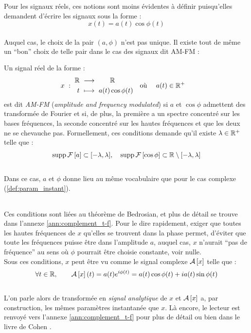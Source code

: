 Pour les signaux réels, ces notions sont moins évidentes à définir puisqu'elles demandent d'écrire les signaux sous la forme :
\[x(t) = a(t) \cos\phi(t)\]
\\
Auquel cas, le choix de la pair $(a,\phi)$ n'est pas unique. Il existe tout de même un ``bon'' choix de telle pair dans le cas des signaux dit AM-FM :
\begin{definition}[Signal AM-FM]
	Un signal réel de la forme :
	\begin{align}
		x\ &:\ \begin{aligned}\mathbb{R}\ &\longrightarrow\qquad \mathbb{R} \\
			t\ &\longmapsto\ a(t) \cos\phi(t)
		\end{aligned}  &  \text{où }\quad a(t)\in\mathbb{R}^+\quad
	\end{align}
	est dit \emph{AM-FM} (\emph{amplitude and frequency modulated}) si $a$ et $\cos\phi$ admettent des transformée de Fourier et si, de plus, la première a un spectre concentré sur les bases fréquences, la seconde concentré sur les hautes fréquences et que les deux ne se chevauche pas.
	Formellement, ces conditions demande qu'il existe $\lambda\in\mathbb{R}^+$ telle que :
	\begin{equation}\label{eq:condi_AM-FM}
		\text{\normalfont supp}\, \mathcal{F}\left[a\right] \subset [-\lambda, \lambda],\quad \text{\normalfont supp}\, \mathcal{F}\left[\cos\phi\right] \subset \mathbb{R}\setminus[-\lambda,\lambda]
	\end{equation}
	\\
	Dans ce cas, $a$ et $\phi$ donne lieu au même vocabulaire que pour le cas complexe (\cref{def:param_instant}).
\end{definition}
\skipl
\\
Ces conditions sont liées au théorème de Bedrosian, et plus de détail se trouve dans l'annexe \ref{ann:complement_t-f}. Pour le dire rapidement, exiger que toutes les hautes fréquences de $x$ qu'elles se trouvent dans la phase permet, d'éviter que toute les fréquences puisse être dans l'amplitude $a$, auquel cas, $x$ n'aurait ``pas de fréquence'' au sens où $\phi$ pourrait être choisie constante, voir nulle.
\\
Sous ces conditions, $x$ peut être vu comme le signal complexe $\mathcal{A}\left[x\right]$ telle que :
\begin{equation}
	\forall t\in\mathbb{R},\qquad \mathcal{A}\left[x\right](t) = a(t) e^{i\phi(t)}= a(t)\cos\phi(t) + ia(t)\sin\phi(t)
\end{equation}
\\
L'on parle alors de transformée en \emph{signal analytique} de $x$ et $\mathcal{A}\left[x\right]$ a, par construction, les mêmes paramètres instantanée que $x$.
Là encore, le lecteur est renvoyé vers l'annexe \ref{ann:complement_t-f} pour plus de détail ou bien dans le livre de Cohen \cite{cohen_time_1995}.
\\

